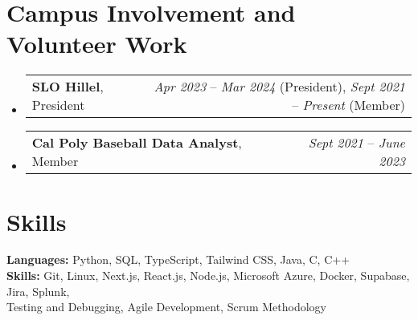 \documentclass[letterpaper,11pt]{article}
\makeatletter
\newcommand{\resumeCampusInvolvement}[3]{
  \item
    \begin{tabular*}{0.97\textwidth}{l@{\extracolsep{\fill}}r}
      \textbf{#1}, #2 & #3 \\
    \end{tabular*}\vspace{-5pt}
}
\newcommand{\resumeSubHeadingListStart}{\begin{itemize}[leftmargin=*]}
\newcommand{\resumeSubHeadingListEnd}{\end{itemize}}
\makeatother
\begin{document}
\section{Campus Involvement and Volunteer Work}
  \resumeSubHeadingListStart
    \resumeCampusInvolvement{SLO Hillel}{President}{\textit{\small Apr 2023} -- \textit{\small Mar 2024} (President), \textit{\small Sept 2021} -- \textit{\small Present} (Member)}    
    \resumeCampusInvolvement{Cal Poly Baseball Data Analyst}{Member}{\textit{\small Sept 2021} -- \textit{\small June 2023}}
  \resumeSubHeadingListEnd
\section{Skills}

\textbf{Languages:} Python, SQL, TypeScript, Tailwind CSS, Java, C, C++\\
\textbf{Skills:} Git, Linux, Next.js, React.js, Node.js, Microsoft Azure, Docker, Supabase, Jira, Splunk,\\ Testing and Debugging, Agile Development, Scrum Methodology

\end{document}
